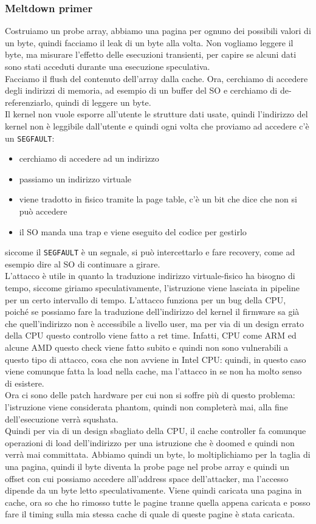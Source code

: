 \documentclass[12pt, oneside]{extbook} %
\begin{document}
\subsubsection{Meltdown primer}
Costruiamo un probe array, abbiamo una pagina per ognuno dei possibili valori di un byte, quindi facciamo il leak di un byte alla volta. Non vogliamo leggere il byte, ma misurare l'effetto delle esecuzioni transienti, per capire se alcuni dati sono stati acceduti durante una esecuzione speculativa.\\ Facciamo il flush del contenuto dell'array dalla cache. Ora, cerchiamo di accedere degli indirizzi di memoria, ad esempio di un buffer del SO e cerchiamo di de-referenziarlo, quindi di leggere un byte.\\ Il kernel non vuole esporre all'utente le strutture dati usate, quindi l'indirizzo del kernel non è leggibile dall'utente e quindi ogni volta che proviamo ad accedere c'è un \texttt{SEGFAULT}:
\begin{itemize}
\item cerchiamo di accedere ad un indirizzo
\item passiamo un indirizzo virtuale
\item viene tradotto in fisico tramite la page table, c'è un bit che dice che non si può accedere
\item il SO manda una trap e viene eseguito del codice per gestirlo
\end{itemize}
siccome il \texttt{SEGFAULT} è un segnale, si può intercettarlo e fare recovery, come ad esempio dire al SO di continuare a girare.\\ L'attacco è utile in quanto la traduzione indirizzo virtuale-fisico ha bisogno di tempo, siccome giriamo speculativamente, l'istruzione viene lasciata in pipeline per un certo intervallo di tempo. L'attacco funziona per un bug della CPU, poiché se possiamo fare la traduzione dell'indirizzo del kernel il firmware sa già che quell'indirizzo non è accessibile a livello user, ma per via di un design errato della CPU questo controllo viene fatto a ret time. Infatti, CPU come ARM ed alcune AMD questo check viene fatto subito e quindi non sono vulnerabili a questo tipo di attacco, cosa che non avviene in Intel CPU: quindi, in questo caso viene comunque fatta la load nella cache, ma l'attacco in se non ha molto senso di esistere.\\ Ora ci sono delle patch hardware per cui non si soffre più di questo problema: l'istruzione viene considerata phantom, quindi non completerà mai, alla fine dell'esecuzione verrà squshata.\\ Quindi per via di un design sbagliato della CPU, il cache controller fa comunque operazioni di load dell'indirizzo per una istruzione che è doomed e quindi non verrà mai committata. Abbiamo quindi un byte, lo moltiplichiamo per la taglia di una pagina, quindi il byte diventa la probe page nel probe array e quindi un offset con cui possiamo accedere all'address space dell'attacker, ma l'accesso dipende da un byte letto speculativamente. Viene quindi caricata una pagina in cache, ora so che ho rimosso tutte le pagine tranne quella appena caricata e posso fare il timing sulla mia stessa cache di quale di queste pagine è stata caricata.
\end{document}
